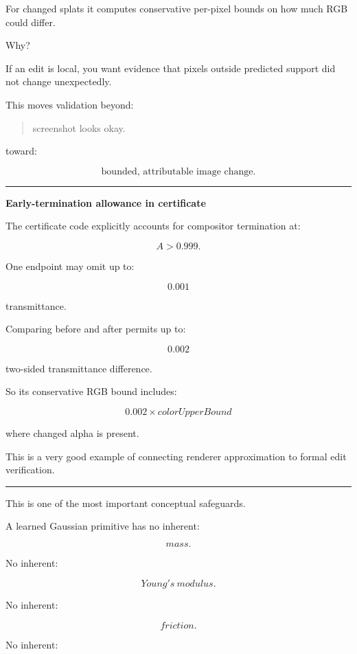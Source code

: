 For changed splats it computes conservative per-pixel bounds on how much RGB could differ.

Why?

If an edit is local, you want evidence that pixels outside predicted support did not change unexpectedly.

This moves validation beyond:

\begin{quote}
screenshot looks okay.
\end{quote}

toward:

\[
\boxed{
\text{bounded, attributable image change}.
}
\]

\begin{center}\rule{0.5\linewidth}{0.5pt}\end{center}

\textbf{Early-termination allowance in certificate}

The certificate code explicitly accounts for compositor termination at:

\[
A>0.999.
\]

One endpoint may omit up to:

\[
0.001
\]

transmittance.

Comparing before and after permits up to:

\[
0.002
\]

two-sided transmittance difference.

So its conservative RGB bound includes:

\[
0.002\times colorUpperBound
\]

where changed alpha is present.

This is a very good example of connecting renderer approximation to formal edit verification.

\begin{center}\rule{0.5\linewidth}{0.5pt}\end{center}

This is one of the most important conceptual safeguards.

A learned Gaussian primitive has no inherent:

\[
mass.
\]

No inherent:

\[
Young's\ modulus.
\]

No inherent:

\[
friction.
\]

No inherent:

